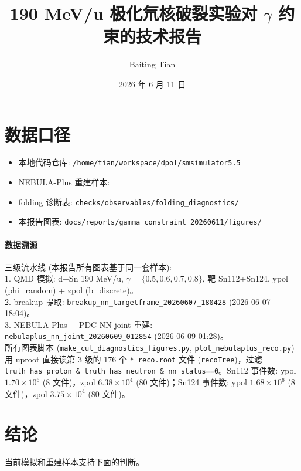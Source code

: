 \documentclass[a4paper,11pt]{article}
\title{\textbf{190 MeV/u 极化氘核破裂实验对 $\gamma$ 约束的技术报告}}
\author{Baiting Tian}
\date{2026 年 6 月 11 日}
\begin{document}
\maketitle

\section*{数据口径}

\begin{itemize}
  \item 本地代码仓库: \texttt{/home/tian/workspace/dpol/smsimulator5.5}
  \item NEBULA-Plus 重建样本: {\footnotesize{}}
  \item folding 诊断表: \texttt{checks/observables/folding\_diagnostics/}
  \item 本报告图表: \texttt{docs/reports/gamma\_constraint\_20260611/figures/}
\end{itemize}

\paragraph{数据溯源}
三级流水线 (本报告所有图表基于同一套样本): \\
1. QMD 模拟: d+Sn 190 MeV/u, $\gamma=\{0.5,0.6,0.7,0.8\}$, 靶 Sn112+Sn124, ypol (phi\_random) + zpol (b\_discrete)。 \\
2. breakup 提取: \texttt{breakup\_nn\_targetframe\_20260607\_180428} (2026-06-07 18:04)。 \\
3. NEBULA-Plus + PDC NN joint 重建: \texttt{nebulaplus\_nn\_joint\_20260609\_012854} (2026-06-09 01:28)。 \\
所有图表脚本 (\texttt{make\_cut\_diagnostics\_figures.py}, \texttt{plot\_nebulaplus\_reco.py}) 用 uproot 直接读第 3 级的 176 个 \texttt{*\_reco.root} 文件 (\texttt{recoTree})，过滤 \texttt{truth\_has\_proton \& truth\_has\_neutron \& nn\_status==0}。Sn112 事件数: ypol $1.70\times10^6$ (8 文件)，zpol $6.38\times10^4$ (80 文件)；Sn124 事件数: ypol $1.68\times10^6$ (8 文件)，zpol $3.75\times10^4$ (80 文件)。

\section*{结论}

当前模拟和重建样本支持下面的判断。
\end{document}
